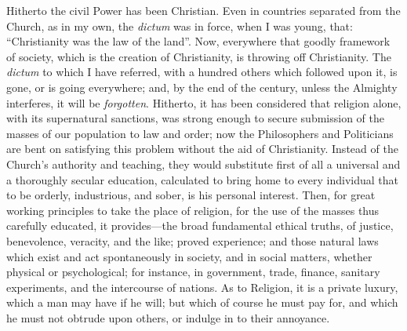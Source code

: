 Hitherto the civil Power has been Christian. Even in countries
separated from the Church, as in my own, the \emph{dictum} was in
force, when I was young, that: ``Christianity was the law of the
land''. Now, everywhere that goodly framework of society, which is
the creation of Christianity, is throwing off Christianity. The \emph{dictum}
to which I have referred, with a hundred others which followed upon
it, is gone, or is going everywhere; and, by the end of the century,
unless the Almighty interferes, it will be \emph{forgotten}.
Hitherto, it has been considered that religion alone, with its
supernatural sanctions, was strong enough to secure submission of the
masses of our population to law and order; now the Philosophers and
Politicians are bent on satisfying this problem without the aid of
Christianity. Instead of the Church's authority and teaching, they
would substitute first of all a universal and a thoroughly secular
education, calculated to bring home to every individual that to be
orderly, industrious, and sober, is his personal interest. Then, for
great working principles to take the place of religion, for the use of
the masses thus carefully educated, it provides—the broad
fundamental ethical truths, of justice, benevolence, veracity, and the
like; proved experience; and those natural laws which exist and act
spontaneously in society, and in social matters, whether physical or
psychological; for instance, in government, trade, finance, sanitary
experiments, and the intercourse of nations. As to Religion, it is a
private luxury, which a man may have if he will; but which of course
he must pay for, and which he must not obtrude upon others, or
indulge in to their annoyance.

